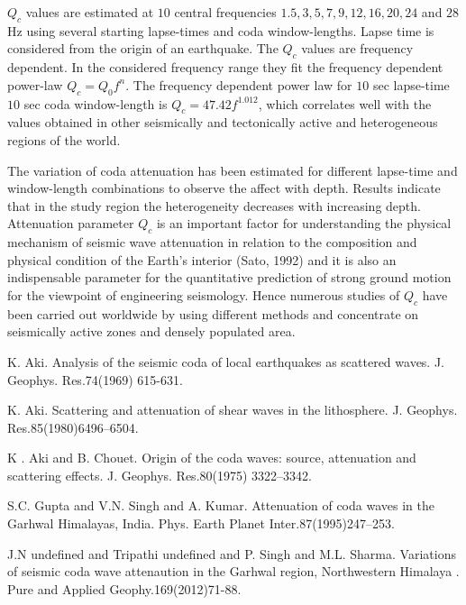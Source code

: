 \documentclass[article,A4,11pt]{llncs}%
\begin{document}
$Q_{c}$ values are estimated at $10$ central frequencies $1.5, 3, 5, 7, 9, 12, 16, 20, 24$ and $28$ Hz using several starting lapse-times and coda window-lengths. Lapse time is considered from the origin of an earthquake. The $Q_{c}$  values are frequency dependent. In the considered frequency range they fit the frequency dependent power-law $Q_{c} = Q_{0}f^{n}$. The frequency dependent power law for $10$ sec lapse-time $10$ sec coda window-length is $Q_{c} = 47.42f^{1.012}$, which correlates well with the values obtained in other seismically and tectonically active and heterogeneous regions of the world.

The variation of coda attenuation has been estimated for different lapse-time and window-length combinations to observe the affect with depth. Results indicate that in the study region the heterogeneity decreases with increasing depth. Attenuation parameter $Q_{c}$  is an important factor for understanding the physical mechanism of seismic wave attenuation in relation to the composition and physical condition of the Earth's interior (Sato, 1992) and it is also an indispensable parameter  for the quantitative prediction of strong ground motion for the viewpoint of engineering seismology. Hence numerous studies of $Q_{c}$  have been carried out worldwide by using different methods and concentrate on seismically active zones and densely populated area.


\begin{thebibliography}{10}
{\sc K. Aki}. {Analysis of the seismic coda of local earthquakes as scattered waves}. J. Geophys. Res.74(1969) 615-631.

{\sc K. Aki}. {Scattering and attenuation of shear waves in the lithosphere}. J. Geophys. Res.85(1980)6496–6504.

{\sc K . Aki and B. Chouet}. {Origin of the coda waves: source, attenuation and scattering effects}. J. Geophys. Res.80(1975) 3322–3342.

{\sc  S.C. Gupta and V.N. Singh and A. Kumar}. { Attenuation of coda waves in the Garhwal Himalayas, India}. Phys. Earth Planet Inter.87(1995)247–253.

{\sc J.N undefined and Tripathi undefined and P. Singh and M.L. Sharma}. {Variations of seismic coda wave attenaution in the Garhwal region, Northwestern Himalaya }. Pure and Applied Geophy.169(2012)71-88.
\end{thebibliography}
\end{document}
